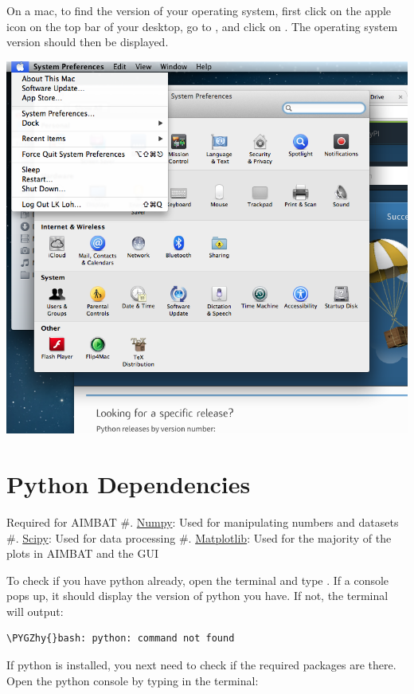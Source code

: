 \documentclass[letterpaper,10pt,english]{sphinxmanual}
\def\PYGZhy{\char`\-}
\begin{document}
On a mac, to find the version of your operating system, first click on the apple icon on the top bar of your desktop, go to , and click on . The operating system version should then be displayed.

\includegraphics{system_preferences.png}


\section{Python Dependencies}
\label{docfiles/install_dependencies:python-dependencies}
Required for AIMBAT
\#. \href{http://www.numpy.org/}{Numpy}: Used for manipulating numbers and datasets
\#. \href{http://www.scipy.org/}{Scipy}: Used for data processing
\#. \href{http://matplotlib.org/}{Matplotlib}: Used for the majority of the plots in AIMBAT and the GUI

To check if you have python already, open the terminal and type . If a console pops up, it should display the version of python you have. If not, the terminal will output:

\begin{Verbatim}[commandchars=\\\{\}]
\PYGZhy{}bash: python: command not found
\end{Verbatim}

If python is installed, you next need to check if the required packages are there. Open the python console by typing in the terminal:
\end{document}
